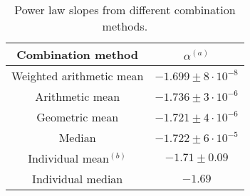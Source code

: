 \begin{table}
\centering
\begin{center}
\caption{Power law slopes from different combination methods.}
\begin{tabular}{cc}
\hline
\noalign{\smallskip}
Combination method &  $\alpha$$^{(a)}$ \\  
\hline


Weighted arithmetic mean  & $-1.699\pm 8 \cdot 10^{-8}$   \\
Arithmetic mean  & $-1.736\pm 3 \cdot 10^{-6}$   \\
Geometric mean  & $-1.721\pm 4 \cdot 10^{-6}$   \\
Median  & $-1.722\pm 6 \cdot 10^{-5}$   \\

Individual mean$^{(b)}$  & $-1.71\pm 0.09$   \\
Individual median & $-1.69$   \\
\hline
\hline
\end{tabular}
\end{center}


\end{table}



